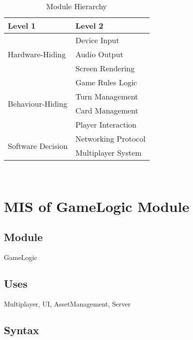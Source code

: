 \documentclass[12pt, titlepage]{article}
\begin{document}
\begin{table}[h!]
\centering
\begin{tabular}{p{} p{}}
\toprule
\textbf{Level 1} & \textbf{Level 2}\\
\midrule

\multirow{3}{0.3\textwidth}{Hardware-Hiding} & Device Input\\
& Audio Output\\
& Screen Rendering\\
\midrule

\multirow{4}{0.3\textwidth}{Behaviour-Hiding} & Game Rules Logic\\
& Turn Management\\
& Card Management\\
& Player Interaction\\
\midrule

\multirow{2}{0.3\textwidth}{Software Decision} 
& Networking Protocol\\
& Multiplayer System\\
\bottomrule

\end{tabular}
\caption{Module Hierarchy}
\label{TblMH}
\end{table}

\newpage
~\newpage

\section{MIS of GameLogic Module} \label{Module} 



\subsection{Module}
\hspace{1.5em}GameLogic

\subsection{Uses}
\hspace{1.5em}Multiplayer, UI, AssetManagement, Server

\subsection{Syntax}
\end{document}
